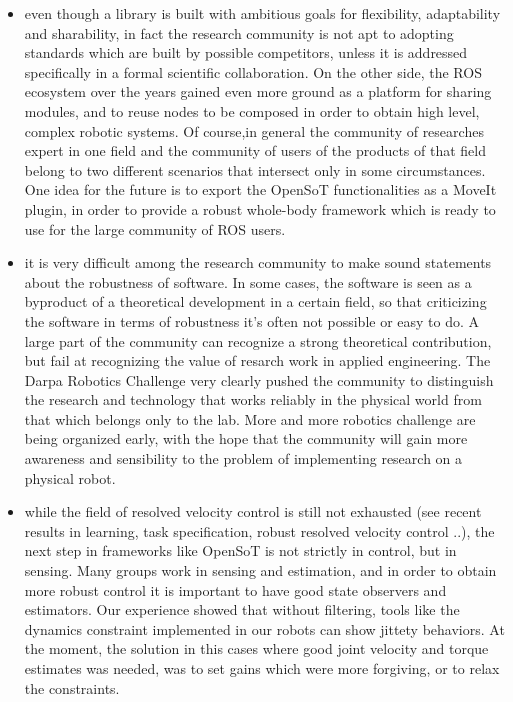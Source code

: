 \documentclass[%
	paper=A4,					%
	twoside=true,				%
	openright,			.
	parskip=full,				%
	chapterprefix=true,			%
	11pt,						%
	headings=normal,			%
	bibliography=totoc,			%
	listof=totoc,				%
	titlepage=on,				%
	captions=tableabove,		%
	draft=true,				%
]{scrreprt}%
\begin{document}
\begin{itemize}
 \item even though a library is built with ambitious goals for flexibility, adaptability and sharability, in fact the research community is not apt to adopting standards which are built by possible competitors, unless it is addressed specifically in a formal scientific collaboration. On the other side, the ROS ecosystem over the years gained even more ground as a platform for sharing modules, and to reuse nodes to be composed in order to obtain high level, complex robotic systems. Of course,in general the community of researches expert in one field and the community of users of the products of that field belong to two different scenarios that intersect only in some circumstances. One idea for the future is to export the OpenSoT functionalities as a MoveIt plugin, in order to provide a robust whole-body framework which is ready to use for the large community of ROS users.
 \item it is very difficult among the research community to make sound statements about the robustness of software. In some cases, the software is seen as a byproduct of a theoretical development in a certain field, so that criticizing the software in terms of robustness it's often not possible or easy to do. A large part of the community can recognize a strong theoretical contribution, but fail at recognizing the value of resarch work in applied engineering. The Darpa Robotics Challenge very clearly pushed the community to distinguish the research and technology that works reliably in the physical world from that which belongs only to the lab. More and more robotics challenge are being organized early, with the hope that the community will gain more awareness and sensibility to the problem of implementing research on a physical robot.
 \item while the field of resolved velocity control is still not exhausted (see recent results in learning, task specification, robust resolved velocity  control ..), the next step in frameworks like OpenSoT is not strictly in control, but in sensing. Many groups work in sensing and estimation, and in order to obtain more robust control it is important to have good state observers and estimators. Our experience showed that without filtering, tools like the dynamics constraint implemented in our robots can show jittety behaviors. At the moment, the solution in this cases where good joint velocity and torque estimates was needed, was to set gains which were more forgiving, or to relax the constraints.

\end{itemize}
\end{document}
